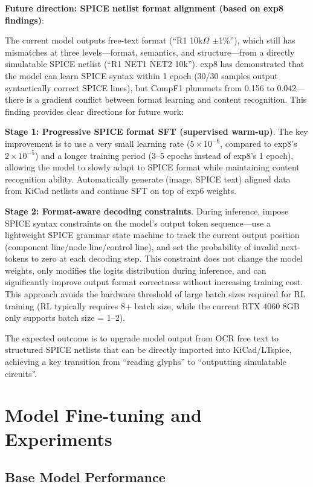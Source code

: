 \textbf{Future direction: SPICE netlist format alignment (based on exp8 findings)}:

The current model outputs free-text format (``R1  10k$\Omega$  $\pm$1\%''), which still has mismatches at three levels---format, semantics, and structure---from a directly simulatable SPICE netlist (``R1 NET1 NET2 10k''). exp8 has demonstrated that the model can learn SPICE syntax within 1 epoch (30/30 samples output syntactically correct SPICE lines), but CompF1 plummets from 0.156 to 0.042---there is a gradient conflict between format learning and content recognition. This finding provides clear directions for future work:

\textbf{Stage 1: Progressive SPICE format SFT (supervised warm-up)}. The key improvement is to use a very small learning rate ($5\times10^{-6}$, compared to exp8's $2\times10^{-5}$) and a longer training period (3--5 epochs instead of exp8's 1 epoch), allowing the model to slowly adapt to SPICE format while maintaining content recognition ability. Automatically generate (image, SPICE text) aligned data from KiCad netlists and continue SFT on top of exp6 weights.

\textbf{Stage 2: Format-aware decoding constraints}. During inference, impose SPICE syntax constraints on the model's output token sequence---use a lightweight SPICE grammar state machine to track the current output position (component line/node line/control line), and set the probability of invalid next-tokens to zero at each decoding step. This constraint does not change the model weights, only modifies the logits distribution during inference, and can significantly improve output format correctness without increasing training cost. This approach avoids the hardware threshold of large batch sizes required for RL training (RL typically requires 8+ batch size, while the current RTX 4060 8GB only supports batch size = 1--2).

The expected outcome is to upgrade model output from OCR free text to structured SPICE netlists that can be directly imported into KiCad/LTspice, achieving a key transition from ``reading glyphs'' to ``outputting simulatable circuits''.

\section{Model Fine-tuning and Experiments}

\subsection{Base Model Performance}

